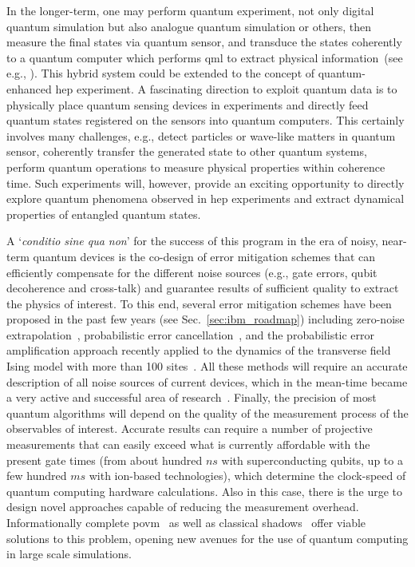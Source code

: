 In the longer-term, one may perform quantum experiment, not only digital quantum simulation but also analogue quantum simulation or others, then measure the final states via quantum sensor, and transduce the states coherently to a quantum computer which performs \gls{qml} to extract physical information~(see e.g., \cite{Huang_2022}).
This hybrid system could be extended to the concept of quantum-enhanced \gls{hep} experiment. A fascinating direction to exploit quantum data is to physically place quantum sensing devices in experiments and directly feed quantum states registered on the sensors into quantum computers. This certainly involves many challenges, e.g., detect particles or wave-like matters in quantum sensor, coherently transfer the generated state to other quantum systems, perform quantum operations to measure physical properties within coherence time. Such experiments will, however, provide an exciting opportunity to directly explore quantum phenomena observed in \gls{hep} experiments and extract dynamical properties of entangled quantum states.

A `\textit{conditio sine qua non}' for the success of this program in the era of noisy, near-term quantum devices is the co-design of error mitigation schemes that can efficiently compensate for  the different noise sources (e.g., gate errors, qubit decoherence and cross-talk) and guarantee results of sufficient quality to extract the physics of interest. To this end, several error mitigation schemes have been proposed in the past few years (see Sec.~\ref{sec:ibm_roadmap}) including zero-noise extrapolation~\cite{Temme2017Error}, probabilistic error cancellation~\cite{Berg2022Probabilistic}, and the probabilistic error amplification approach recently applied to the dynamics of the transverse field Ising model with more than 100 sites~\cite{Eddins_2023}.
All these methods will require an accurate description of all noise sources of current devices, which in the mean-time became a very active and successful area of research~\cite{
Bennett1996Purification, 
Kern2005Quantum, 
geller2013efficient, 
Temme2017Error, 
Kandala2019Error, 
Berg2022Probabilistic}. 
Finally, the precision of most quantum algorithms will depend on the quality of the measurement process of the observables of interest. Accurate results can require a number of projective measurements that can easily exceed what is currently affordable with the present gate times (from about hundred $ns$ with superconducting qubits, up to a few hundred $ms$ with ion-based technologies), which determine the clock-speed of quantum computing hardware calculations. 
Also in this case, there is the urge to design novel approaches capable of reducing the measurement overhead. 
Informationally complete \gls{povm}~\cite{PRXQuantum.2.040342} as well as classical shadows~\cite{Huang2020} offer viable solutions to this problem, opening new avenues for the use of quantum computing in large scale simulations. 


